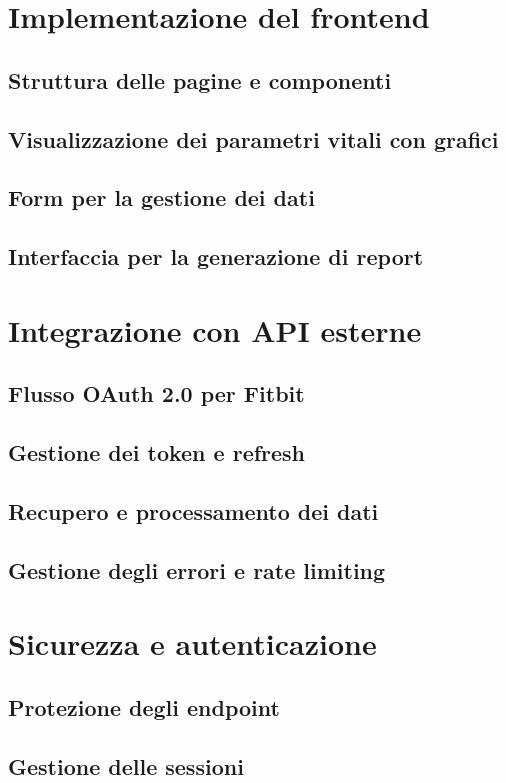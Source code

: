 \documentclass[12pt,a4paper,oneside]{report}
\begin{document}
\section{Implementazione del frontend}
\subsection{Struttura delle pagine e componenti}
\subsection{Visualizzazione dei parametri vitali con grafici}
\subsection{Form per la gestione dei dati}
\subsection{Interfaccia per la generazione di report}

\section{Integrazione con API esterne}
\subsection{Flusso OAuth 2.0 per Fitbit}
\subsection{Gestione dei token e refresh}
\subsection{Recupero e processamento dei dati}
\subsection{Gestione degli errori e rate limiting}

\section{Sicurezza e autenticazione}
\subsection{Protezione degli endpoint}
\subsection{Gestione delle sessioni}
\end{document}

